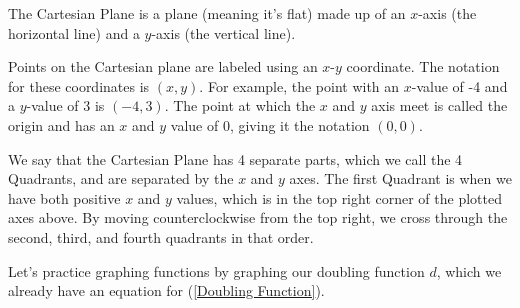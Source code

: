 \begin{presentation}
\begin{defn}\label{The Cartesian Plane}
	The Cartesian Plane is a plane (meaning it's flat) made up of an \color{blue}$x$-axis (the horizontal line) \color{black} and a \color{red} $y$-axis (the vertical line). \color{black}
	\begin{center}
	\end{center}
Points on the Cartesian plane are labeled using an $x$-$y$ coordinate. The notation for these coordinates is $(x,y)$. For example, the point with an $x$-value of -4 and a $y$-value of 3 is $(-4,3)$. The point at which the $x$ and $y$ axis meet is called the origin and has an $x$ and $y$ value of 0, giving it the notation $(0,0)$. 

\smallskip
We say that the Cartesian Plane has 4 separate parts, which we call the 4 Quadrants, and are separated by the $x$ and $y$ axes. The first Quadrant is when we have both positive $x$ and $y$ values, which is in the top right corner of the plotted axes above. By moving counterclockwise from the top right, we cross through the second, third, and fourth quadrants in that order. 
\end{defn}
\end{presentation}

\begin{prblm}
Let's practice graphing functions by graphing our doubling function $d$, which we already have an equation for (\ref{Doubling Function}).
\vspace{5cm}
\end{prblm}

